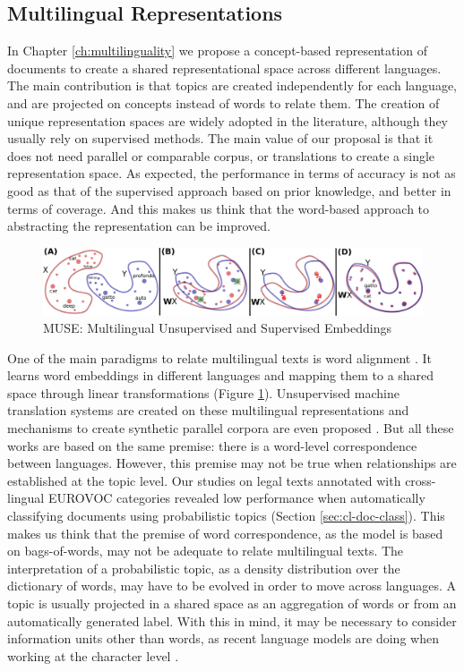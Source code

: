 \subsection{Multilingual Representations}

In Chapter \ref{ch:multilinguality} we propose a concept-based representation of documents to create a shared representational space across different languages. The main contribution is that topics are created independently for each language, and are projected on concepts instead of words to relate them. The creation of unique representation spaces are widely adopted in the literature, although they usually rely on supervised methods. The main value of our proposal is that it does not need parallel or comparable corpus, or translations to create a single representation space. As expected, the performance in terms of accuracy is not as good as that of the supervised approach based on prior knowledge, and better in terms of coverage. And this makes us think that the word-based approach to abstracting the representation can be improved.

\begin{figure}[ht]
    \centering
    \includegraphics[width=\linewidth]{muse.png}
    \caption{MUSE: Multilingual Unsupervised and Supervised Embeddings \citep{Lample2018}}
    \label{fig:muse}
\end{figure}


One of the main paradigms to relate multilingual texts is word alignment \citep{joulin2018loss, Lample2018}. It learns word embeddings in different languages and mapping them to a shared space through linear transformations (Figure \ref{fig:muse}). Unsupervised machine translation systems are created on these multilingual representations and mechanisms to create synthetic parallel corpora are even proposed \citep{artetxe2019}. But all these works are based on the same premise: there is a word-level correspondence between languages. However, this premise may not be true when relationships are established at the topic level. Our studies on legal texts annotated with cross-lingual EUROVOC categories revealed low performance when automatically classifying documents using probabilistic topics (Section \ref{sec:cl-doc-class}). This makes us think that the premise of word correspondence, as the model is based on bags-of-words, may not be adequate to relate multilingual texts. The interpretation of a probabilistic topic, as a density distribution over the dictionary of words, may have to be evolved in order to move across languages. A topic is usually projected in a shared space as an aggregation of words or from an automatically generated label. With this in mind, it may be necessary to consider information units other than words, as recent language models are doing when working at the character level \citep{Al-Rfou_Choe_Constant_Guo_Jones_2019}.


